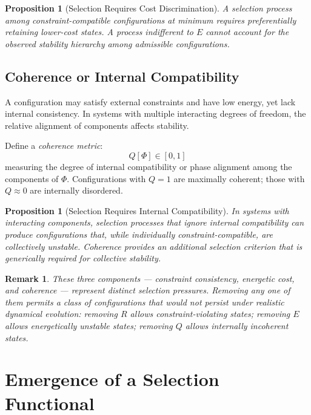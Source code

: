 \documentclass[12pt]{article}
\newtheorem{proposition}[theorem]{Proposition}
\newtheorem{remark}[theorem]{Remark}
\begin{document}
\begin{proposition}[Selection Requires Cost Discrimination]
A selection process among constraint-compatible configurations at minimum requires preferentially retaining lower-cost states. A process indifferent to $E$ cannot account for the observed stability hierarchy among admissible configurations.
\end{proposition}

\subsection{Coherence or Internal Compatibility}

A configuration may satisfy external constraints and have low energy, yet lack internal consistency. In systems with multiple interacting degrees of freedom, the relative alignment of components affects stability.

Define a \textit{coherence metric}:
\begin{equation}\label{eq:coherence}
    Q[\Phi] \in [0, 1]
\end{equation}
measuring the degree of internal compatibility or phase alignment among the components of $\Phi$. Configurations with $Q = 1$ are maximally coherent; those with $Q \approx 0$ are internally disordered.

\begin{proposition}[Selection Requires Internal Compatibility]
In systems with interacting components, selection processes that ignore internal compatibility can produce configurations that, while individually constraint-compatible, are collectively unstable. Coherence provides an additional selection criterion that is generically required for collective stability.
\end{proposition}

\begin{remark}
These three components --- constraint consistency, energetic cost, and coherence --- represent \textit{distinct} selection pressures. Removing any one of them permits a class of configurations that would not persist under realistic dynamical evolution: removing $R$ allows constraint-violating states; removing $E$ allows energetically unstable states; removing $Q$ allows internally incoherent states.
\end{remark}

\section{Emergence of a Selection Functional}\label{sec:functional}
\end{document}
